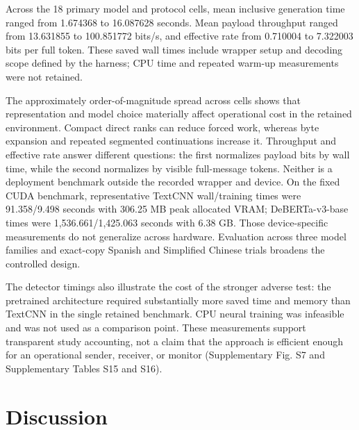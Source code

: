 \documentclass[fleqn,10pt]{wlscirep}
\begin{document}
Across the 18 primary model and protocol cells, mean inclusive generation time ranged from 1.674368 to 16.087628 seconds. Mean payload throughput ranged from 13.631855 to 100.851772 bits/s, and effective rate from 0.710004 to 7.322003 bits per full token. These saved wall times include wrapper setup and decoding scope defined by the harness; CPU time and repeated warm-up measurements were not retained.

The approximately order-of-magnitude spread across cells shows that representation and model choice materially affect operational cost in the retained environment. Compact direct ranks can reduce forced work, whereas byte expansion and repeated segmented continuations increase it. Throughput and effective rate answer different questions: the first normalizes payload bits by wall time, while the second normalizes by visible full-message tokens. Neither is a deployment benchmark outside the recorded wrapper and device.
On the fixed CUDA benchmark, representative TextCNN wall/training times were 91.358/9.498 seconds with 306.25 MB peak allocated VRAM; DeBERTa-v3-base times were 1,536.661/1,425.063 seconds with 6.38 GB. Those device-specific measurements do not generalize across hardware. Evaluation across three model families and exact-copy Spanish and Simplified Chinese trials broadens the controlled design.%

The detector timings also illustrate the cost of the stronger adverse test: the pretrained architecture required substantially more saved time and memory than TextCNN in the single retained benchmark. CPU neural training was infeasible and was not used as a comparison point. These measurements support transparent study accounting, not a claim that the approach is efficient enough for an operational sender, receiver, or monitor (Supplementary Fig. S7 and Supplementary Tables S15 and S16).




\section*{Discussion}\label{sec:discussion}
\end{document}
